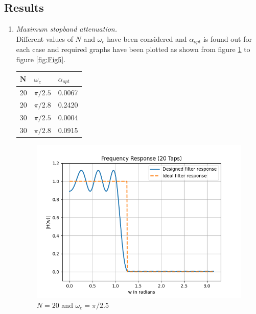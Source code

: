 \documentclass[conference]{IEEEtran}
\begin{document}
\subsection{Results}
\begin{enumerate}[label=(\alph*)]
\item \textit{Maximum stopband attenuation.}\\
Different values of $N$ and $\omega_c$ have been considered and $\alpha_{opt}$ is found out for each case and required graphs have been plotted as shown from figure \ref{fig:Fig2} to figure \ref{fig:Fig5}.
\vspace{3mm}
\begin{center}
\begin{tabular}{ | m{3em} | m{1cm}| m{1cm} | } 
  \hline
  $\textbf{N}$& \textbf{$\omega_c$} & \textbf{$\alpha_{opt}$}\\ 
  \hline
  20 & $\pi/2.5$ & 0.0067 \\ 
  \hline
  20 & $\pi/2.8$ & 0.2420 \\ 
  \hline
  30 & $\pi/2.5$ & 0.0004 \\ 
  \hline
  30 & $\pi/2.8$ & 0.0915\\ 
  \hline
\end{tabular}
\end{center}

\begin{figure}[!h]
	\begin{center} 
	    \includegraphics[width=0.7\columnwidth]{figs/A/N20_w1}
	\end{center}
\caption{$N=20$ and $\omega_c = \pi/2.5$}
\label{fig:Fig2}
\end{figure}


\end{enumerate}
\end{document}
